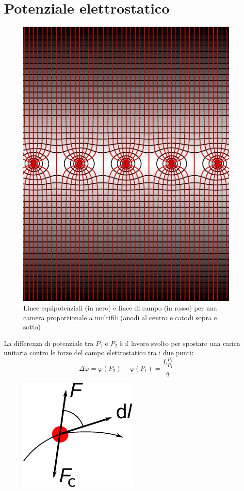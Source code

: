 \section{Potenziale elettrostatico}
\begin{figure}[htp]
 \centering
 \includegraphics{immagini/fisica2/MWPC}
 \caption{Linee equipotenziali (in nero) e linee di campo (in rosso) per una camera proporzionale a multifili (anodi al centro e catodi sopra e sotto)}
\end{figure}
\begin{Def}
La differenza di potenziale tra $P_1$ e $P_2$ è il lavoro svolto per spostare una carica unitaria contro le forze del campo elettrostatico tra i due punti:
\begin{equation}
 \Delta\varphi=\varphi(P_2)-\varphi(P_1)=\frac{L_{P_1}^{P_2}}{q} 
\end{equation}
\end{Def}
\begin{figure}[htp]
 \centering
 \includegraphics{immagini/fisica2/lavoro_campo}
\end{figure}

